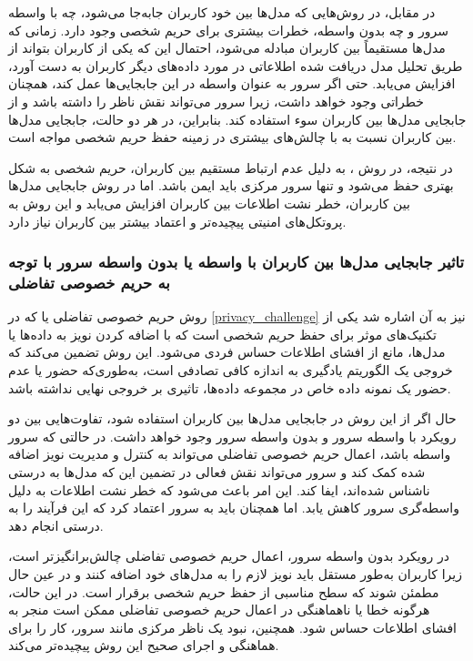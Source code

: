 در مقابل، در روش‌هایی که مدل‌ها بین خود کاربران جابه‌جا می‌شود، چه با واسطه سرور و چه بدون واسطه، خطرات بیشتری برای حریم شخصی وجود دارد. زمانی که مدل‌ها مستقیماً بین کاربران مبادله می‌شود، احتمال این که یکی از کاربران بتواند از طریق تحلیل مدل دریافت ‌شده اطلاعاتی در مورد داده‌های دیگر کاربران به دست آورد، افزایش می‌یابد. حتی اگر سرور به عنوان واسطه در این جابجایی‌ها عمل کند، همچنان خطراتی وجود خواهد داشت، زیرا سرور می‌تواند نقش ناظر را داشته باشد و از جابجایی مدل‌ها بین کاربران سوء استفاده کند. بنابراین، در هر دو حالت، جابجایی مدل‌ها بین کاربران نسبت به
با چالش‌های بیشتری در زمینه حفظ حریم شخصی مواجه است.

در نتیجه، در روش
%
، به دلیل عدم ارتباط مستقیم بین کاربران، حریم شخصی به شکل بهتری حفظ می‌شود و تنها سرور مرکزی باید ایمن باشد. اما در روش جابجایی مدل‌ها بین کاربران، خطر نشت اطلاعات بین کاربران افزایش می‌یابد و این روش به پروتکل‌های امنیتی پیچیده‌تر و اعتماد بیشتر بین کاربران نیاز دارد.

\vspace{3mm}
\subsubsection{تاثیر جابجایی مدل‌ها بین کاربران با واسطه یا بدون واسطه سرور با توجه به حریم خصوصی تفاضلی}\vspace{-1mm}
روش حریم خصوصی تفاضلی یا
که در
\ref{privacy_challenge}
نیز به آن اشاره شد یکی از تکنیک‌های موثر برای حفظ حریم شخصی است که با اضافه کردن نویز به داده‌ها یا مدل‌ها، مانع از افشای اطلاعات حساس فردی می‌شود. این روش تضمین می‌کند که خروجی یک الگوریتم یادگیری به اندازه کافی تصادفی است، به‌طوری‌که حضور یا عدم حضور یک نمونه داده خاص در مجموعه داده‌ها، تاثیری بر خروجی نهایی نداشته باشد.

حال اگر از این روش در جابجایی مدل‌ها بین کاربران استفاده شود، تفاوت‌هایی بین دو رویکرد با واسطه سرور و بدون واسطه سرور وجود خواهد داشت. در حالتی که سرور واسطه باشد، اعمال حریم خصوصی تفاضلی می‌تواند به کنترل و مدیریت نویز اضافه شده کمک کند و سرور می‌تواند نقش فعالی در تضمین این که مدل‌ها به درستی ناشناس‌ شده‌اند، ایفا کند. این امر باعث می‌شود که خطر نشت اطلاعات به دلیل واسطه‌گری سرور کاهش یابد. اما همچنان باید به سرور اعتماد کرد که این فرآیند را به درستی انجام دهد.

در رویکرد بدون واسطه سرور، اعمال حریم خصوصی تفاضلی چالش‌برانگیزتر است، زیرا کاربران به‌طور مستقل باید نویز لازم را به مدل‌های خود اضافه کنند و در عین حال مطمئن شوند که سطح مناسبی از حفظ حریم شخصی برقرار است. در این حالت، هرگونه خطا یا ناهماهنگی در اعمال حریم خصوصی تفاضلی ممکن است منجر به افشای اطلاعات حساس شود. همچنین، نبود یک ناظر مرکزی مانند سرور، کار را برای هماهنگی و اجرای صحیح این روش پیچیده‌تر می‌کند.

